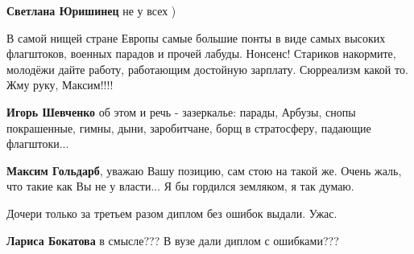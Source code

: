 \begin{itemize}
\begin{itemize}
\textbf{Светлана Юришинец} не у всех )
\end{itemize}

 

В самой нищей стране Европы самые большие понты в виде самых высоких
флагштоков, военных парадов и прочей лабуды. Нонсенс! Стариков накормите,
молодёжи дайте работу, работающим достойную зарплату. Сюрреализм какой то. Жму
руку, Максим!!!!🤝

\begin{itemize}
 
\textbf{Игорь Шевченко} об этом и речь - зазеркалье: парады, Арбузы, снопы покрашенные, гимны, дыни, заробитчане, борщ в стратосферу, падающие флагштоки...

 
\textbf{Максим Гольдарб}, уважаю Вашу позицию, сам стою на такой же. Очень жаль, что такие как Вы не у власти... Я бы гордился земляком, я так думаю.
\end{itemize}

 
Дочери только за третьем разом диплом без ошибок выдали. Ужас.

\begin{itemize}
 
\textbf{Лариса Бокатова} в смысле??? В вузе дали диплом с ошибками???


\end{itemize}
\end{itemize}
